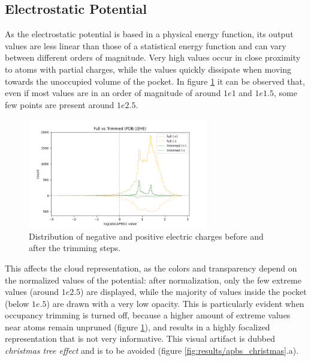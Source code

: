   \subsection{Electrostatic Potential}
    As the electrostatic potential is based in a physical energy function, its output values are less linear than those of a statistical energy function and can vary between different orders of magnitude. Very high values occur in close proximity to atoms with partial charges, while the values quickly dissipate when moving towards the unoccupied volume of the pocket. In figure \ref{fig:results/logapbs_trimming} it can be observed that, even if most values are in an order of magnitude of around $1e1$ and $1e1.5$, some few points are present around $1e2.5$.

    \begin{figure}[H]
      \centering
      \includegraphics[width=0.7\textwidth]{figures/results/logapbs_trimming.png}
      \caption{\label{fig:results/logapbs_trimming} Distribution of negative and positive electric charges before and after the trimming steps.}
    \end{figure}

    This affects the cloud representation, as the colors and transparency depend on the normalized values of the potential: after normalization, only the few extreme values (around $1e2.5$) are displayed, while the majority of values inside the pocket (below $1e.5$) are drawn with a very low opacity. This is particularly evident when occupancy trimming is turned off, because a higher amount of extreme values near atoms remain unpruned (figure \ref{fig:results/logapbs_trimming}), and results in a highly focalized representation that is not very informative. This visual artifact is dubbed \textit{christmas tree effect} and is to be avoided (figure \ref{fig:results/apbs_christmas}.a).

